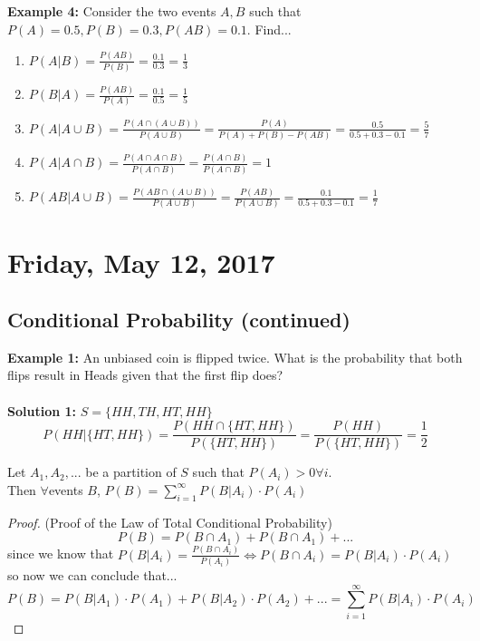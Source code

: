 \documentclass[12pt, twoside]{article}
\begin{document}
\textbf{Example 4:} Consider the two events $A,B$ such that\\
$P(A) = 0.5, P(B) = 0.3, P(AB) = 0.1$. Find...
\begin{enumerate}
	\item{$P(A|B) = \frac{P(AB)}{P(B)} = \frac{0.1}{0.3} = \frac{1}{3}$}
	\item{$P(B|A) = \frac{P(AB)}{P(A)} = \frac{0.1}{0.5} = \frac{1}{5}$}
	\item{$P(A|A\cup B) = \frac{P(A\cap(A\cup B))}{P(A \cup B)} = \frac{P(A)}{P(A)+P(B)-P(AB)} = \frac{0.5}{0.5+0.3-0.1} = \frac{5}{7}$}
	\item{$P(A|A\cap B) = \frac{P(A\cap A\cap B)}{P(A\cap B)} = \frac{P(A\cap B)}{P(A\cap B)} =1$}
	\item{$P(AB | A\cup B) = \frac{P(AB \cap (A\cup B))}{P(A \cup B)} = \frac{P(AB)}{P(A\cup B)} = \frac{0.1}{0.5+0.3-0.1} = \frac{1}{7}$}
\end{enumerate}

\newpage

\section{Friday, May 12, 2017}

\subsection{Conditional Probability (continued)}

\textbf{Example 1:} An unbiased coin is flipped twice. What is the probability that both flips result in Heads given that the first flip does?\\
\\
\textbf{Solution 1:} $S = \{ HH, TH, HT, HH \}$\\
$$P(HH | \{ HT, HH \}) = \frac{P(HH \cap \{ HT, HH \})}{P(\{ HT, HH \})} = \frac{P(HH)}{P(\{ HT, HH \})} = \frac{1}{2}$$

\begin{tcolorbox}[title=Theorem: Law of Total Conditional Probability]
	Let $A_1, A_2, ...$ be a partition of $S$ such that $P(A_i) > 0 \forall i$.\\
	Then $\forall$events $B$, $P(B) = \sum\limits_{i=1}^{\infty} P(B | A_i)\cdot P(A_i)$
\end{tcolorbox}

\begin{proof}
	(Proof of the Law of Total Conditional Probability)\\
	$$P(B) = P(B \cap A_1) + P(B \cap A_1) + ...$$
	since we know that $P(B | A_i) = \frac{P(B \cap A_i)}{P(A_i)} \Longleftrightarrow P(B \cap A_i) = P(B | A_i)\cdot P(A_i)$\\
	so now we can conclude that...\\
	$$P(B) = P(B | A_1)\cdot P(A_1) + P(B | A_2)\cdot P(A_2) + ... = \sum\limits_{i=1}^{\infty} P(B | A_i)\cdot P(A_i)$$
\end{proof}
\end{document}
